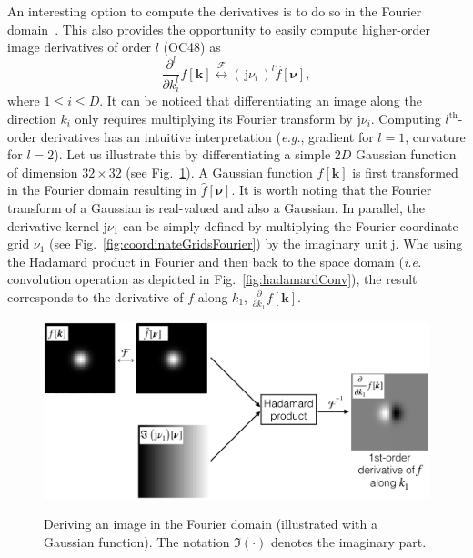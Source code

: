 \documentclass[fleqn,a4paper,oneside,openany]{book}
\newcommand\textid[1]{{\normalsize{\idfont #1}}}
\begin{document}
An interesting option to compute the derivatives is to do so in the Fourier domain~\cite{DeF2017}.
This also provides the opportunity to easily compute higher-order image derivatives of order $l$ (\textid{OC48}) as
%
\begin{equation}\label{eq:FourierDerivative}
\frac{\partial^l}{\partial k_i^l} f[\boldsymbol{k}] \overset{\mathcal{F}}{\longleftrightarrow} (\,\mathrm{j}\nu_i\,)^l \hat{f}[\boldsymbol{\nu}],
\end{equation}
%
where $1\leq i \leq D$.
It can be noticed that differentiating an image along the direction $k_i$ only requires multiplying its Fourier transform by $\mathrm{j}\nu_i$.
Computing $l^{\text{th}}$-order derivatives has an intuitive interpretation (\emph{e.g.}, gradient for $l=1$, curvature for $l=2$).
Let us illustrate this by differentiating a simple 2$D$ Gaussian function of dimension $32\times 32$ (see Fig.~\ref{fig:GaussianDerivative}).
A Gaussian function $f[\boldsymbol{k}]$ is first transformed in the Fourier domain resulting in $\hat{f}[\boldsymbol{\nu}]$. It is worth noting that the Fourier transform of a Gaussian is real-valued and also a Gaussian.
In parallel, the derivative kernel $\mathrm{j}\nu_1$ can be simply defined by multiplying the Fourier coordinate grid $\nu_1$ (see Fig.~\ref{fig:coordinateGridsFourier}) by the imaginary unit $\mathrm{j}$.
Whe using the Hadamard product in Fourier and then back to the space domain (\emph{i.e.} convolution operation as depicted in Fig.~\ref{fig:hadamardConv}), the result corresponds to the derivative of $f$ along $k_1$, $\frac{\partial}{\partial k_1} f[\boldsymbol{k}]$.
%
\begin{figure}
\centering
\includegraphics[trim = 0 0 0 0, clip, width=1\linewidth]{GaussianDerivative.png}\\
\caption{Deriving an image in the Fourier domain (illustrated with a Gaussian function). The notation $\Im(\cdot)$ denotes the imaginary part.}
  \label{fig:GaussianDerivative}
\end{figure}
%
\end{document}

